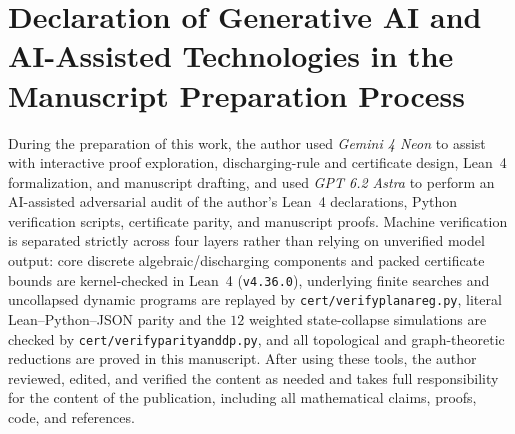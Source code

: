 \documentclass[11pt,reqno]{amsart}
\theoremstyle{plain}
\theoremstyle{definition}
\theoremstyle{remark}
\DeclareRobustCommand{\_}{\ifmmode\text{\textunderscore}\else\textunderscore\allowbreak\fi}
\begin{document}
\section*{Declaration of Generative AI and AI-Assisted Technologies in the Manuscript Preparation Process}

During the preparation of this work, the author used \emph{Gemini 4 Neon} to assist with interactive proof exploration, discharging-rule and certificate design, Lean~4 formalization, and manuscript drafting, and used \emph{GPT 6.2 Astra} to perform an AI-assisted adversarial audit of the author's Lean~4 declarations, Python verification scripts, certificate parity, and manuscript proofs. Machine verification is separated strictly across four layers rather than relying on unverified model output: core discrete algebraic/discharging components and packed certificate bounds are kernel-checked in Lean~4 (\texttt{v4.36.0}), underlying finite searches and uncollapsed dynamic programs are replayed by \texttt{cert/verify\_planar\_eg.py}, literal Lean--Python--JSON parity and the $12$ weighted state-collapse simulations are checked by \texttt{cert/verify\_parity\_and\_dp.py}, and all topological and graph-theoretic reductions are proved in this manuscript. After using these tools, the author reviewed, edited, and verified the content as needed and takes full responsibility for the content of the publication, including all mathematical claims, proofs, code, and references.
\end{document}
